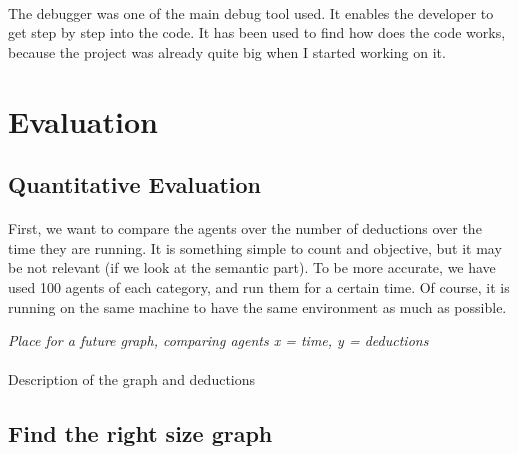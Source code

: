 \documentclass{article}
\begin{document}
			\paragraph{}
				The debugger was one of the main debug tool used.
				It enables the developer to get step by step into the code.
				It has been used to find how does the code works, because the project was already quite big when I started working on it.

\section{Evaluation}
	\subsection{Quantitative Evaluation}
		\paragraph{}
			First, we want to compare the agents over the number of deductions over the time they are running.
			It is something simple to count and objective, but it may be not relevant (if we look at the semantic part).
			To be more accurate, we have used 100 agents of each category, and run them for a certain time.
			Of course, it is running on the same machine to have the same environment as much as possible.
		\begin{center}
			\textit{Place for a future graph, comparing agents x = time, y = deductions}
		\end{center}
		\paragraph{}
			Description of the graph and deductions
	\subsection{Find the right size graph}
\end{document}
